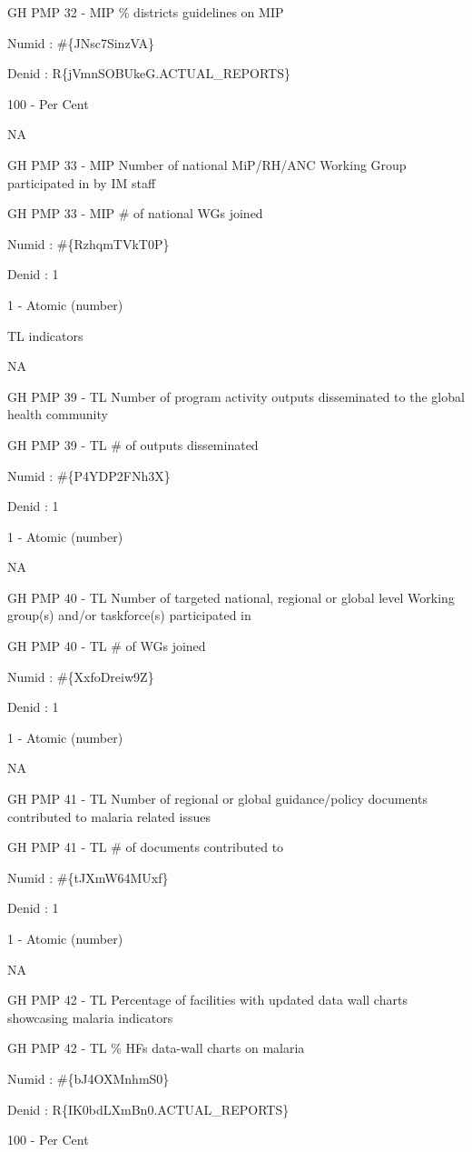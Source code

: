 \documentclass[]{book}
\begin{document}
GH PMP 32 - MIP \% districts guidelines on MIP

Numid : \#\{JNsc7SinzVA\}

Denid : R\{jVmnSOBUkeG.ACTUAL\_REPORTS\}

100 - Per Cent

NA

GH PMP 33 - MIP Number of national MiP/RH/ANC Working Group participated in by IM staff

GH PMP 33 - MIP \# of national WGs joined

Numid : \#\{RzhqmTVkT0P\}

Denid : 1

1 - Atomic (number)

TL indicators

NA

GH PMP 39 - TL Number of program activity outputs disseminated to the global health community

GH PMP 39 - TL \# of outputs disseminated

Numid : \#\{P4YDP2FNh3X\}

Denid : 1

1 - Atomic (number)

NA

GH PMP 40 - TL Number of targeted national, regional or global level Working group(s) and/or taskforce(s) participated in

GH PMP 40 - TL \# of WGs joined

Numid : \#\{XxfoDreiw9Z\}

Denid : 1

1 - Atomic (number)

NA

GH PMP 41 - TL Number of regional or global guidance/policy documents contributed to malaria related issues

GH PMP 41 - TL \# of documents contributed to

Numid : \#\{tJXmW64MUxf\}

Denid : 1

1 - Atomic (number)

NA

GH PMP 42 - TL Percentage of facilities with updated data wall charts showcasing malaria indicators

GH PMP 42 - TL \% HFs data-wall charts on malaria

Numid : \#\{bJ4OXMnhmS0\}

Denid : R\{IK0bdLXmBn0.ACTUAL\_REPORTS\}

100 - Per Cent
\end{document}
